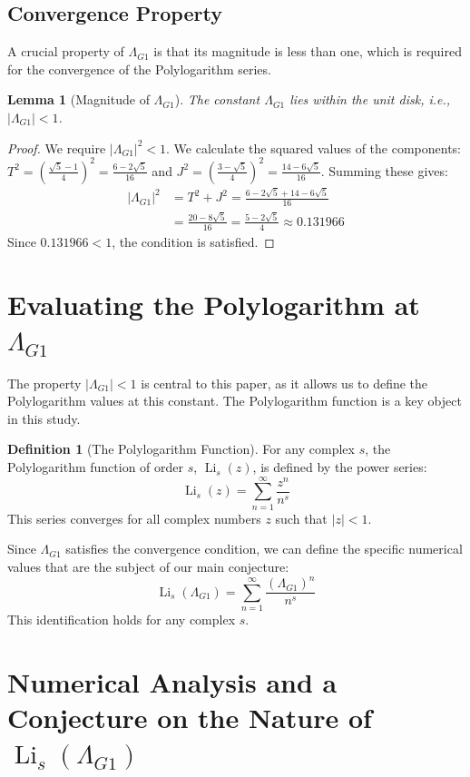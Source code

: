 \documentclass{amsart}
\theoremstyle{plain}
\newtheorem{lemma}[theorem]{Lemma}
\theoremstyle{definition}
\newtheorem{definition}[theorem]{Definition}
\theoremstyle{remark}
\DeclareMathOperator{\Li}{Li} %
\newcommand{\LambdaG}{\Lambda_{G1}}
\begin{document}
\subsection{Convergence Property}
A crucial property of $\LambdaG$ is that its magnitude is less than one, which is required for the convergence of the Polylogarithm series.
\begin{lemma}[Magnitude of $\LambdaG$]
\label{lem:convergence}
The constant $\LambdaG$ lies within the unit disk, i.e., $|\LambdaG| < 1$.
\end{lemma}
\begin{proof}
We require $|\LambdaG|^2 < 1$. We calculate the squared values of the components: $T^2 = \left(\frac{\sqrt{5}-1}{4}\right)^2 = \frac{6-2\sqrt{5}}{16}$ and $J^2 = \left(\frac{3-\sqrt{5}}{4}\right)^2 = \frac{14-6\sqrt{5}}{16}$. Summing these gives:
\begin{align*}
    |\LambdaG|^2 &= T^2+J^2 = \frac{6-2\sqrt{5} + 14-6\sqrt{5}}{16} \\
                 &= \frac{20-8\sqrt{5}}{16} = \frac{5-2\sqrt{5}}{4} \approx 0.131966
\end{align*}
Since $0.131966 < 1$, the condition is satisfied.
\qedhere
\end{proof}

\section{Evaluating the Polylogarithm at \texorpdfstring{$\LambdaG$}{Lambda\_G1}}
The property $|\LambdaG| < 1$ is central to this paper, as it allows us to define the Polylogarithm values at this constant. The Polylogarithm function is a key object in this study.
\begin{definition}[The Polylogarithm Function]
For any complex $s$, the Polylogarithm function of order $s$, $\Li_s(z)$, is defined by the power series:
\[ \Li_s(z) = \sum_{n=1}^{\infty} \frac{z^n}{n^s} \]
This series converges for all complex numbers $z$ such that $|z|<1$.
\end{definition}

Since $\LambdaG$ satisfies the convergence condition, we can define the specific numerical values that are the subject of our main conjecture:
\[ \Li_s(\LambdaG) = \sum_{n=1}^{\infty} \frac{(\LambdaG)^{n}}{n^s} \]
This identification holds for any complex $s$.

\section{Numerical Analysis and a Conjecture on the Nature of \texorpdfstring{$\Li_s(\LambdaG)$}{Li\_s(Lambda\_G1)}}
\end{document}
